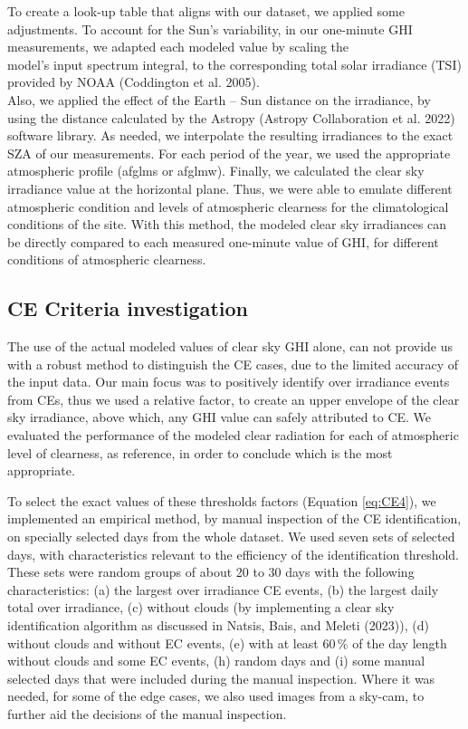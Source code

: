 \documentclass[
  preprint, 3p, authoryear]{article}
\begin{document}
To create a look-up table that aligns with our dataset, we applied some adjustments.
To account for the Sun's variability, in our one-minute GHI measurements,
we adapted each modeled value by scaling the\\
model's input spectrum integral, to the corresponding total solar irradiance (TSI)
provided by NOAA (Coddington et al. 2005).\\
Also, we applied the effect of the Earth -- Sun
distance on the irradiance, by using the distance calculated by the Astropy
(Astropy Collaboration et al. 2022) software library. As needed, we interpolate the resulting
irradiances to the exact SZA of our measurements. For each period of the year, we
used the appropriate atmospheric profile (afglms or afglmw). Finally, we calculated
the clear sky irradiance value at the horizontal plane. Thus, we were able to
emulate different atmospheric condition and levels of atmospheric clearness for the
climatological conditions of the site. With this method, the modeled clear sky
irradiances can be directly compared to each measured one-minute value of GHI, for
different conditions of atmospheric clearness.

\hypertarget{ce-criteria-investigation}{%
\subsection{CE Criteria investigation}\label{ce-criteria-investigation}}

The use of the actual modeled values of clear sky GHI alone, can not provide us with
a robust method to distinguish the CE cases, due to the limited accuracy of the input
data. Our main focus was to positively identify over irradiance events from CEs, thus
we used a relative factor, to create an upper envelope of the clear sky irradiance,
above which, any GHI value can safely attributed to CE. We evaluated the performance
of the modeled clear radiation for each of atmospheric level of clearness, as
reference, in order to conclude which is the most appropriate.

To select the exact values of these thresholds factors (Equation \ref{eq:CE4}), we
implemented an empirical method, by manual inspection of the CE identification, on
specially selected days from the whole dataset. We used seven sets of selected days,
with characteristics relevant to the efficiency of the identification threshold.
These sets were random groups of about 20 to 30 days with the following
characteristics:
(a) the largest over irradiance CE events,
(b) the largest daily total over irradiance,
(c) without clouds (by implementing a clear sky identification algorithm as discussed in Natsis, Bais, and Meleti (2023)),
(d) without clouds and without EC events,
(e) with at least \(60\,\%\) of the day length without clouds and some EC events,
(h) random days and
(i) some manual selected days that were included during the manual inspection.
Where it was needed, for some of the edge cases, we also used images from a sky-cam,
to further aid the decisions of the manual inspection.
\end{document}
